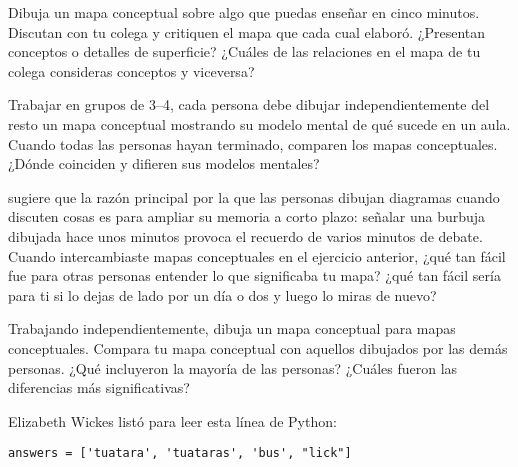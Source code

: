 

Dibuja un mapa conceptual sobre algo que puedas enseñar en cinco minutos.
Discutan con tu colega y critiquen el mapa que cada cual elaboró.
¿Presentan conceptos o detalles de superficie?
¿Cuáles de las relaciones en el mapa de tu colega consideras conceptos y viceversa?


Trabajar en grupos de 3--4,
cada persona debe dibujar independientemente del resto un mapa conceptual mostrando su modelo mental de qué sucede en un aula.
Cuando todas las personas hayan terminado,
comparen los mapas conceptuales.
¿Dónde coinciden y difieren sus modelos mentales?


\cite{Cher2007} sugiere que
la razón principal por la que las personas dibujan diagramas cuando discuten cosas
es para ampliar su memoria a corto plazo:
señalar una burbuja dibujada hace unos minutos provoca el recuerdo de varios minutos de debate.
Cuando intercambiaste mapas conceptuales en el ejercicio anterior,
¿qué tan fácil fue para otras personas entender lo que significaba tu mapa?
¿qué tan fácil sería para ti si lo dejas de lado por un día o dos y luego lo miras de nuevo?


Trabajando independientemente,
dibuja un mapa conceptual para mapas conceptuales.
Compara tu mapa conceptual con aquellos dibujados por las demás personas.
¿Qué incluyeron la mayoría de las personas?
¿Cuáles fueron las diferencias más significativas?


Elizabeth Wickes listó
para leer esta línea de Python:

\begin{verbatim}
answers = ['tuatara', 'tuataras', 'bus', "lick"]
\end{verbatim}

